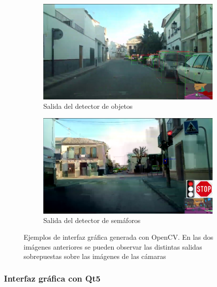 \begin{figure}[h!]
    \begin{subfigure}[c]{.5\textwidth}
      \centering
      \includegraphics[width=.9\linewidth]{img/InterfazCV2_1.png}
      \caption{Salida del detector de objetos}
      \label{fig:interfaz_cv_1}
    \end{subfigure}%
    \begin{subfigure}[c]{.5\textwidth}
      \centering
      \includegraphics[width=.9\linewidth]{img/InterfazCV2_2.png}
      \caption{Salida del detector de semáforos}
      \label{fig:interfaz_cv_2}
    \end{subfigure}
    
    \caption[Ejemplos de interfaz gráfica generada con OpenCV]{Ejemplos de interfaz gráfica generada con OpenCV. En las dos imágenes anteriores se pueden observar las distintas salidas sobrepuestas sobre las imágenes de las cámaras}
    \label{fig:interfaz_cv}
\end{figure}




\subsubsection{Interfaz gráfica con Qt5}

